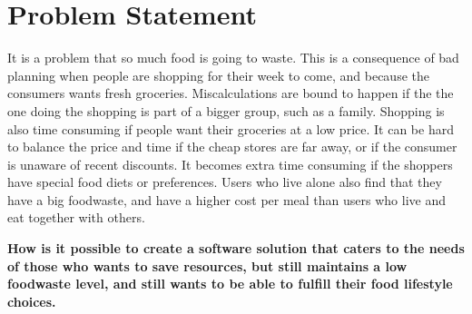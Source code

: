 \chapter{Problem Statement}
It is a problem that so much food is going to waste. This is a consequence of bad planning when people are shopping for their week to come, and because the consumers wants fresh groceries. Miscalculations are bound to happen if the the one doing the shopping is part of a bigger group, such as a family. Shopping is also time consuming if people want their groceries at a low price. It can be hard to balance the price and time if the cheap stores are far away, or if the consumer is unaware of recent discounts. It becomes extra time consuming if the shoppers have special food diets or preferences. Users who live alone also find that they have a big foodwaste, and have a higher cost per meal than users who live and eat together with others.

\textbf{How is it possible to create a software solution that caters to the needs of those who wants to save resources, but still maintains a low foodwaste level, and still wants to be able to fulfill their food lifestyle choices.}

